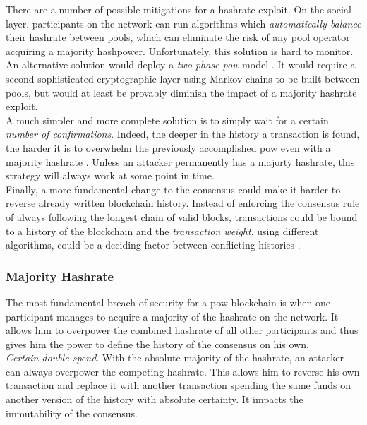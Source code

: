 \documentclass[12pt,a4paper]{article}
\begin{document}
There are a number of possible mitigations for a hashrate exploit. On the social layer, participants on the network can run algorithms which \textit{automatically balance} their \gls{hashrate} between \glspl{pool}, which can eliminate the risk of any pool operator acquiring a majority hashpower. Unfortunately, this solution is hard to monitor.\\

An alternative solution would deploy a \textit{two-phase \acrshort{pow}} model \cite{twophase}. It would require a second sophisticated cryptographic layer using Markov chains to be built between \glspl{pool}, but would at least be provably diminish the impact of a majority \gls{hashrate} exploit.\\

A much simpler and more complete solution is to simply wait for a certain \textit{number of confirmations}. Indeed, the deeper in the history a \gls{transaction} is found, the harder it is to overwhelm the previously accomplished \acrshort{pow} even with a majority \gls{hashrate} \cite{double}. Unless an attacker permanently has a majorty hashrate, this strategy will always work at some point in time.\\

Finally, a more fundamental change to the \gls{consensus} could make it harder to reverse already written blockchain history. Instead of enforcing the consensus rule of always following the longest chain of valid blocks, \glspl{transaction} could be bound to a history of the blockchain and the \textit{\gls{transaction} weight}, using different algorithms, could be a deciding factor between conflicting histories \cite{weight}.\\

\subsubsection{Majority Hashrate}

The most fundamental breach of security for a \acrshort{pow} \gls{blockchain} is when one participant manages to acquire a majority of the \gls{hashrate} on the network. It allows him to overpower the combined \gls{hashrate} of all other participants and thus gives him the power to define the history of the \gls{consensus} on his own.\\

\textit{Certain double spend}. With the absolute majority of the \gls{hashrate}, an attacker can always overpower the competing \gls{hashrate}. This allows him to reverse his own \gls{transaction} and replace it with another \gls{transaction} spending the same funds on another version of the history with absolute certainty. It impacts the immutability of the \gls{consensus}.\\
\end{document}
